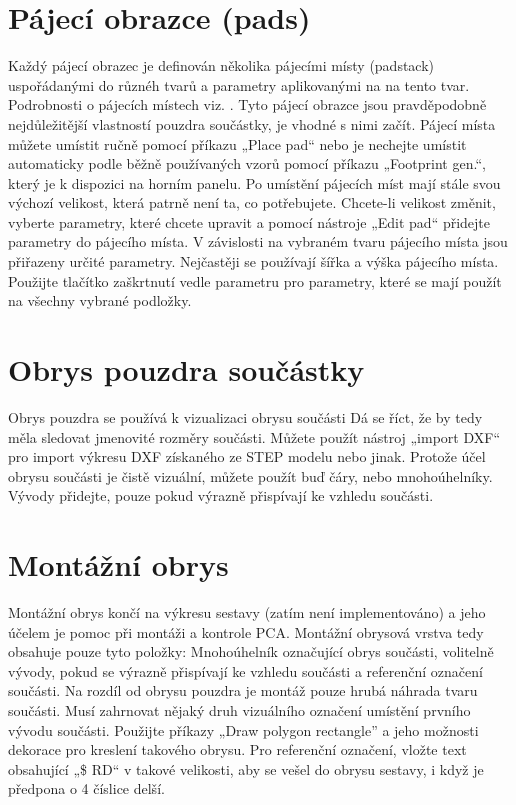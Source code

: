 \documentclass[letterpaper,10pt,czech]{sphinxmanual}
\begin{document}
\section{Pájecí obrazce (pads)}
\label{\detokenize{create-package:pajeci-obrazce-pads}}
Každý pájecí obrazec je definován několika pájecími místy (padstack) uspořádanými do různéh tvarů a parametry aplikovanými na na tento tvar. Podrobnosti o pájecích místech viz.
. Tyto pájecí obrazce jsou pravděpodobně nejdůležitější vlastností pouzdra součástky, je vhodné s nimi začít. Pájecí místa můžete umístit ručně pomocí příkazu „Place pad“ nebo je nechejte umístit automaticky podle běžně používaných vzorů pomocí příkazu „Footprint gen.“, který je k dispozici na horním panelu. Po umístění pájecích míst mají stále svou výchozí velikost, která patrně není ta, co potřebujete. Chcete-li velikost změnit, vyberte parametry, které chcete upravit a pomocí nástroje „Edit pad“ přidejte parametry do pájecího místa. V závislosti na vybraném tvaru pájecího místa jsou přiřazeny určité parametry. Nejčastěji se používají šířka a výška pájecího místa. Použijte tlačítko zaškrtnutí vedle parametru pro parametry, které se mají použít na všechny vybrané podložky.


\section{Obrys pouzdra součástky}
\label{\detokenize{create-package:obrys-pouzdra-soucastky}}
Obrys pouzdra se používá k vizualizaci obrysu součásti
Dá se říct, že by tedy měla sledovat jmenovité rozměry součásti. Můžete použít nástroj „import DXF“ pro import výkresu DXF získaného ze STEP modelu nebo jinak. Protože účel obrysu součásti je čistě
vizuální, můžete použít buď čáry, nebo mnohoúhelníky. Vývody přidejte, pouze pokud
výrazně přispívají ke vzhledu součásti.


\section{Montážní obrys}
\label{\detokenize{create-package:montazni-obrys}}
Montážní obrys končí na výkresu sestavy (zatím není implementováno) a jeho účelem je pomoc při montáži a kontrole PCA. Montážní obrysová vrstva tedy obsahuje pouze tyto položky: Mnohoúhelník označující obrys součásti, volitelně vývody, pokud se výrazně přispívají ke vzhledu součásti a referenční označení součásti. Na rozdíl od obrysu pouzdra je montáž pouze hrubá náhrada tvaru součásti. Musí zahrnovat nějaký druh vizuálního označení umístění prvního vývodu součásti. Použijte příkazy  „Draw polygon rectangle” a jeho možnosti dekorace pro kreslení takového obrysu. Pro referenční označení, vložte text obsahující „\$ RD“ v takové velikosti, aby se vešel do obrysu sestavy, i když je předpona o 4 číslice delší.
\end{document}
